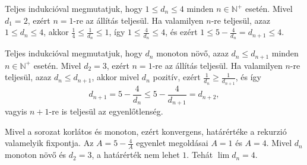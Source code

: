 \documentclass[11pt]{scrartcl}
\begin{document}
Teljes indukcióval megmutatjuk, hogy $1 \le d_n \le 4$ minden
$n \in \mathbb{N}^+$ esetén. Mivel $d_1 = 2$, ezért $n = 1$-re az állítás
teljesül. Ha valamilyen $n$-re teljesül, azaz $1 \le d_n \le 4$, akkor
$\frac{1}{4} \le \frac{1}{d_n} \le 1$, így $1 \le \frac{4}{d_n} \le 4$, és
ezért $1 \le 5 - \frac{4}{d_n} = d_{n + 1} \le 4$.

Teljes indukcióval megmutatjuk, hogy $d_n$ monoton növő, azaz
$d_n \le d_{n + 1}$ minden $n \in \mathbb{N}^+$ esetén. Mivel $d_2 = 3$,
ezért $n = 1$-re az állítás teljesül. Ha valamilyen $n$-re teljesül, azaz
$d_n \le d_{n + 1}$, akkor mivel $d_n$ pozitív, ezért
$\frac{1}{d_n} \ge \frac{1}{d_{n + 1}}$, és így
\[
	d_{n + 1} = 5 - \frac{4}{d_n} \le 5 - \frac{4}{d_{n + 1}} = d_{n + 2},
\]
vagyis $n + 1$-re is teljesül az egyenlőtlenség.

Mivel a sorozat korlátos és monoton, ezért konvergens, határértéke a
rekurzió valamelyik fixpontja. Az $A = 5 - \frac{4}{A}$ egyenlet megoldásai
$A = 1$ és $A = 4$. Mivel $d_n$ monoton növő és $d_2 = 3$, a határérték nem
lehet $1$. Tehát $\lim d_n = 4$.
\end{document}
